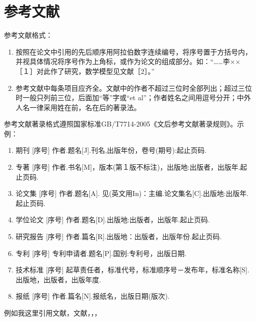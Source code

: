 \chapter{参考文献}

参考文献格式：
\begin{enumerate}[label=\arabic*.\quad]
    \item 按照在论文中引用的先后顺序用阿拉伯数字连续编号，将序号置于方括号内，并视具体情况将序号作为上角标，或作为论文的组成部分。如：“……李××［１］对此作了研究，数学模型见文献［2］。” 
    \item 参考文献中每条项目应齐全。文献中的作者不超过三位时全部列出；超过三位时一般只列前三位，后面加“等”字或“et al”；作者姓名之间用逗号分开；中外人名一律采用姓在前，名在后的著录法。
\end{enumerate}

参考文献著录格式遵照国家标准GB/T7714-2005《文后参考文献著录规则》。示例：
\begin{enumerate}[label=（\arabic*）\quad]
    \item 期刊
    [序号] 作者.题名[J].刊名,出版年份，卷号(期号):起止页码.
    \item 专著
    [序号] 作者.书名[M]，版本(第１版不标注)，出版地:出版者，出版年.起止页码.
    \item 论文集
    [序号] 作者.题名[A]. 见(英文用In)：主编.论文集名[C].出版地:出版年.起止页码.
    \item 学位论文
    [序号] 作者.题名[D].出版地:出版者，出版年.起止页码.
    \item 研究报告
    [序号] 作者.篇名[R].出版地：出版者，出版年份.起止页码.
    \item 专利
    [序号] 专利申请者.题名[P].国别:专利号，出版日期.
    \item 技术标准
    [序号] 起草责任者，标准代号，标准顺序号－发布年，标准名称[S].出版地，出版者，出版年度.
    \item 报纸
    [序号] 作者.篇名[N].报纸名，出版日期(版次).
\end{enumerate}

例如我这里引用文献\cite{2001Applying}，文献\cite{2004PSO_ZhangLibiao}，\cite{2005Improve_JinYixiong}，\cite{2021A}，


\nocite{*}


